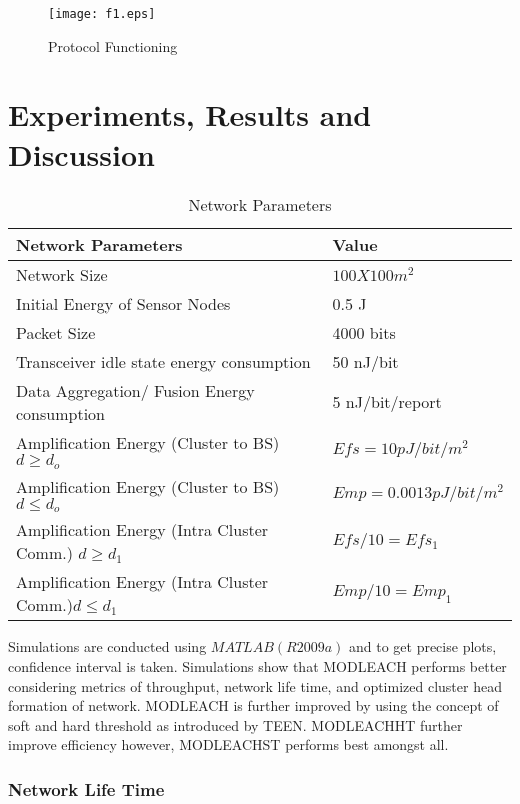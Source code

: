\documentclass[10pt, conference, compsocconf]{IEEEtran}
\begin{document}
\begin{figure*}
\begin{center}
\texttt{[image: f1.eps]}
\caption{Protocol Functioning}
\end{center}
\end{figure*}
\section{Experiments, Results and Discussion}

\begin{table}
  \centering
 \caption{Network Parameters}
\begin{tabular}{p{6cm}| p{2.5cm}}
\hline{}
 \textbf{Network Parameters }              & \textbf{Value}	    \\
\hline{}
Network Size  	& $ 100 X 100 m^2 $  \\
Initial Energy of Sensor Nodes &	0.5 J\\
Packet Size	& 4000 bits \\
Transceiver idle state energy consumption	& 50 nJ/bit \\
Data Aggregation/ Fusion Energy consumption&	5 nJ/bit/report\\
Amplification Energy (Cluster to BS)$d\geq d_o$	& $Efs=10pJ/bit/m^2$ \\
Amplification Energy (Cluster to BS) $d \leq d_o$ &	$Emp=0.0013pJ/bit/m^2$\\
Amplification Energy (Intra Cluster Comm.) $d\geq d_1$	& $Efs/10= Efs_1$\\
Amplification Energy (Intra Cluster Comm.)$d \leq d_1$ &	$Emp/10= Emp_1$\\




 \end{tabular}

\end{table}

Simulations are conducted using $ MATLAB (R2009a)$ and to get precise plots, confidence interval is taken. Simulations show that MODLEACH performs better considering metrics of throughput, network life time, and optimized cluster head formation of network. MODLEACH is further improved by using the concept of soft and hard threshold as introduced by TEEN. MODLEACHHT further improve efficiency however, MODLEACHST performs best amongst all.

\subsubsection{Network Life Time}
\end{document}
